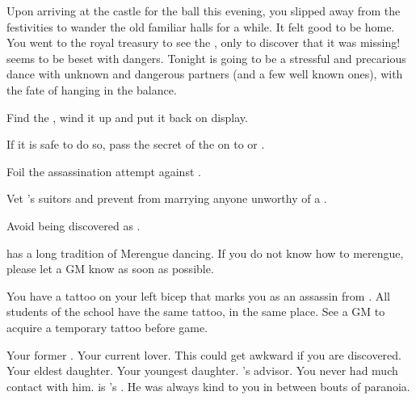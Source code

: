 \documentclass[char]{NeptuneBall}
\begin{document}
Upon arriving at the castle for the ball this evening, you slipped away from the festivities to wander the old familiar halls for a while. It felt good to be home. You went to the royal treasury to see the \iMusicBox{\MYname}, only to discover that it was missing! \pAtlantis{} seems to be beset with dangers. Tonight is going to be a stressful and precarious dance with unknown and dangerous partners (and a few well known ones), with the fate of \pAtlantis{} hanging in the balance.


\begin{itemz}[Goals]
  \item Find the \iMusicBox{}, wind it up and put it back on display.
  \item If it is safe to do so, pass the secret of the \iMusicBox{} on to \cAriel{} or \cPrincess{}.
  \item Foil the assassination attempt against \cKing{}.
  \item Vet \cPrincess{}'s suitors and prevent \cPrincess{\them} from marrying anyone unworthy of a \cPrincess{\prince}.
  \item Avoid being discovered as \cQueen{\King} \cQueen{}.
\end{itemz}


\begin{itemz}[Notes]
  \item \pAtlantis{} has a long tradition of Merengue dancing. If you do not know how to merengue, please let a GM know as soon as possible.
  \item You have a tattoo on your left bicep that marks you as an assassin from \pAssassin{}. All students of the school have the same tattoo, in the same place. See a GM to acquire a temporary tattoo before game.
\end{itemz}

\begin{contacts}
  \contact{\cKing{}} Your former \cKing{\spouse{}}.
  \contact{\cGeneral{}} Your current lover. This could get awkward if you are discovered.
  \contact{\cAriel{}} Your eldest daughter.
  \contact{\cPrincess{}} Your youngest daughter.
  \contact{\cManta{}} \cKing{}'s advisor. You never had much contact with him.
  \contact{\cPlant{}} \cPlant{} is \cKing{}'s \cPlant{\sibling}. He was always kind to you in between bouts of paranoia.
\end{contacts}
\end{document}
